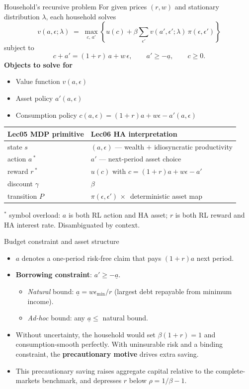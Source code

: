 \begin{frame}{Household's recursive problem}
For given prices $(r,w)$ and stationary distribution $\lambda$, each household solves
\[
v(a,\epsilon;\lambda) \;=\; \max_{c,\,a'}\!\left\{u(c) + \beta \sum_{\epsilon'} v(a',\epsilon';\lambda)\,\pi(\epsilon,\epsilon')\right\}
\]
subject to
\[
c + a' = (1+r)\,a + w\,\epsilon, \qquad a' \geq -\underline{a}, \qquad c \geq 0.
\]
\medskip
\textbf{Objects to solve for}
\begin{itemize}
\item Value function $v(a,\epsilon)$
\item Asset policy $a'(a,\epsilon)$
\item Consumption policy $c(a,\epsilon) = (1+r)a + w\epsilon - a'(a,\epsilon)$
\end{itemize}
\medskip
\begin{center}
\footnotesize
\begin{tabular}{ll}
\toprule
\textbf{Lec05 MDP primitive} & \textbf{Lec06 HA interpretation} \\
\midrule
state $s$ & $(a, \epsilon)$ --- wealth $+$ idiosyncratic productivity \\
action $a$\,$^{\ast}$ & $a'$ --- next-period asset choice \\
reward $r$\,$^{\ast}$ & $u(c)$ with $c = (1+r)a + w\epsilon - a'$ \\
discount $\gamma$ & $\beta$ \\
transition $P$ & $\pi(\epsilon, \epsilon') \,\times\,$ deterministic asset map \\
\bottomrule
\end{tabular}
\end{center}
\vspace{-0.5em}
{\scriptsize $^{\ast}$ symbol overload: $a$ is both RL action and HA asset; $r$ is both RL reward and HA interest rate. Disambiguated by context.}
\end{frame}

\begin{frame}{Budget constraint and asset structure}
\begin{itemize}
\item $a$ denotes a one-period risk-free claim that pays $(1+r)a$ next period.
\medskip
\item \textbf{Borrowing constraint}: $a' \geq -\underline{a}$.
  \begin{itemize}
  \item \emph{Natural} bound: $\underline{a} = w\epsilon_{\min}/r$ (largest debt repayable from minimum income).
  \item \emph{Ad-hoc} bound: any $\underline{a} \leq$ natural bound.
  \end{itemize}
\medskip
\item Without uncertainty, the household would set $\beta(1+r)=1$ and consumption-smooth perfectly. With uninsurable risk and a binding constraint, the \textbf{precautionary motive} drives extra saving.
\medskip
\item This precautionary saving raises aggregate capital relative to the complete-markets benchmark, and depresses $r$ below $\rho = 1/\beta - 1$.
\end{itemize}
\end{frame}

